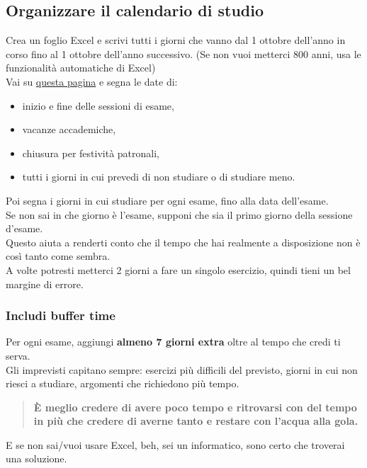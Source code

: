 \documentclass[18pt]{extarticle}
\begin{document}
\subsection{Organizzare il calendario di studio}
Crea un foglio Excel e scrivi tutti i giorni che vanno dal 1 ottobre dell'anno in corso fino al 1 ottobre dell'anno successivo. (Se non vuoi metterci 800 anni, usa le funzionalità automatiche di Excel)\\
Vai su \href{https://www.uniud.it/it/didattica/corsi/area-scientifica/scienze-matematiche-informatiche-multimediali-fisiche/laurea/informatica/studiare/orario-lezioni}{questa pagina} e segna le date di:
\begin{itemize}
\item inizio e fine delle sessioni di esame,
\item vacanze accademiche,
\item chiusura per festività patronali,
\item tutti i giorni in cui prevedi di non studiare o di studiare meno.
\end{itemize}
Poi segna i giorni in cui studiare per ogni esame, fino alla data dell'esame.\\
Se non sai in che giorno è l'esame, supponi che sia il primo giorno della sessione d'esame.\\
Questo aiuta a renderti conto che il tempo che hai realmente a disposizione non è così tanto come sembra.\\
A volte potresti metterci 2 giorni a fare un singolo esercizio, quindi tieni un bel margine di errore.


\subsubsection{Includi buffer time}
Per ogni esame, aggiungi \textbf{almeno 7 giorni extra} oltre al tempo che credi ti serva.\\
Gli imprevisti capitano sempre: esercizi più difficili del previsto, giorni in cui non riesci a studiare, argomenti che richiedono più tempo.
\begin{quote}
\textbf{È meglio credere di avere poco tempo e ritrovarsi con del tempo in più che credere di averne tanto e restare con l'acqua alla gola.}
\end{quote}%
E se non sai/vuoi usare Excel, beh, sei un informatico, sono certo che troverai una soluzione.
\end{document}
